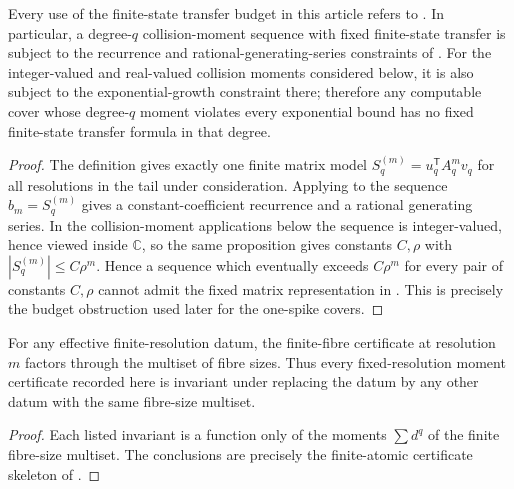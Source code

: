\begin{proposition}
\label{prop:fixed-transfer-interface-budget}
Every use of the finite-state transfer budget in this article refers to
.  In particular, a degree-\(q\)
collision-moment sequence with fixed finite-state transfer is subject to the
recurrence and rational-generating-series constraints of
.  For the integer-valued and
real-valued collision moments considered below, it is also subject to the
exponential-growth constraint there; therefore any computable cover whose
degree-\(q\) moment violates every exponential bound has no fixed finite-state
transfer formula in that degree.
\end{proposition}

\begin{proof}
The definition gives exactly one finite matrix model
\(S_q^{(m)}=u_q^{\mathsf T}A_q^m v_q\) for all resolutions in the tail under
consideration.  Applying  to the
sequence \(b_m=S_q^{(m)}\) gives a constant-coefficient recurrence and a rational
generating series.  In the collision-moment applications below the sequence is
integer-valued, hence viewed inside \(\mathbb C\), so the same proposition gives
constants \(C,\rho\) with \(|S_q^{(m)}|\le C\rho^m\).  Hence a sequence which
eventually exceeds \(C\rho^m\) for every pair of constants \(C,\rho\) cannot
admit the fixed matrix representation in .
This is precisely the budget obstruction used later for the one-spike covers.
\end{proof}

\begin{proposition}
\label{prop:finite-fiber-certificate-taxonomy}
For any effective finite-resolution datum, the finite-fibre certificate at
resolution \(m\) factors through the multiset of fibre sizes.  Thus every
fixed-resolution moment certificate recorded here is invariant under replacing
the datum by any other datum with the same fibre-size multiset.
\end{proposition}

\begin{proof}
Each listed invariant is a function only of the moments \(\sum d^q\) of the
finite fibre-size multiset.  The conclusions are precisely the finite-atomic
certificate skeleton of .
\end{proof}

